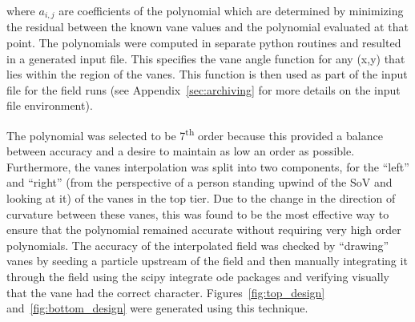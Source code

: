 where $a_{i,j}$ are coefficients of the polynomial which are 
determined by minimizing the residual between the 
known vane values and the polynomial evaluated at that point. 
The polynomials were computed in separate python routines and 
resulted in a generated input file. This specifies the vane angle
function for any (x,y) that lies within the region of the vanes. 
This function is then used as part of the input file for the 
field runs (see Appendix~\ref{sec:archiving} for 
more details on the input file environment). 
%
%


The polynomial was selected to be 7\textsuperscript{th} order because this
provided a balance between accuracy and a desire to maintain as low
an order as possible. Furthermore, the vanes interpolation was split
into two components, for the ``left'' and ``right'' (from the perspective of a
person standing upwind of the SoV and looking at it) of the vanes in the
top tier. Due to the change in the direction of curvature between these vanes, 
this was found to be the most effective way to ensure that the
polynomial remained accurate without requiring very high order
polynomials. The accuracy of the interpolated field was checked by
``drawing'' vanes by seeding a particle upstream of the field and then
manually integrating it through the field using the scipy integrate ode
packages and verifying visually that the vane had the correct
character. Figures~\ref{fig:top_design} and~\ref{fig:bottom_design} were
generated using this technique. 

